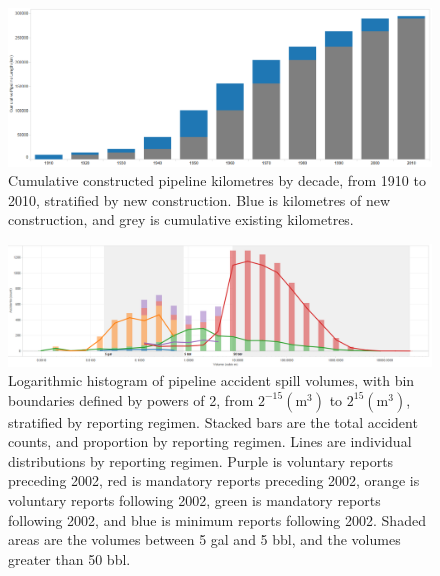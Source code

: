 \documentclass[letterpaper,10pt,oneside,final,onecolumn]{article}
\begin{document}
	\begin{figure}
		\centering
		\includegraphics[keepaspectratio=true,scale=0.3]{../images/MileageHistogramCrop.png}
		\caption{Cumulative constructed pipeline kilometres by decade, from 1910 to 2010, stratified by new construction. 
			Blue is kilometres of new construction, and grey is cumulative existing kilometres.
		}
		\label{mileage-year}
	\end{figure}

	\begin{figure}
		\centering
		\includegraphics[keepaspectratio=true,scale=0.239]{../images/VolumeHistogramCrop.png}
		\caption{Logarithmic histogram of pipeline accident spill volumes, with bin boundaries defined by powers of 2, from $2^{-15}\left(\text{m}^3\right)$ to $2^{15} \left(\text{m}^3\right)$, stratified by reporting regimen.
			Stacked bars are the total accident counts, and proportion by reporting regimen. 
			Lines are individual distributions by reporting regimen. 
			Purple is voluntary reports preceding 2002, red is mandatory reports preceding 2002, orange is voluntary reports following 2002, green is mandatory reports following 2002, and blue is minimum reports following 2002.
			Shaded areas are the volumes between 5 gal and 5 bbl, and the volumes greater than 50 bbl.
		}
		\label{volume-histogram}
	\end{figure}
\end{document}
